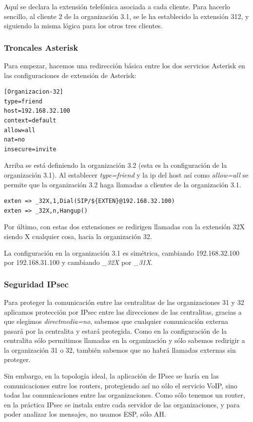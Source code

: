 \documentclass[]{article}
\begin{document}
Aquí se declara la extensión telefónica asociada a cada cliente. Para hacerlo sencillo, al cliente 2 de la organización 3.1, se le ha establecido la extensión 312, y siguiendo la misma lógica para los otros tres clientes.

\subsubsection{Troncales Asterisk}
Para empezar, hacemos una redirección básica entre los dos servicios Asterisk en las configuraciones de extensión de Asterisk:
\begin{Verbatim}
[Organizacion-32]
type=friend
host=192.168.32.100
context=default
allow=all
nat=no
insecure=invite
\end{Verbatim}

Arriba se está definiendo la organización 3.2 (esta es la configuración de la organización 3.1). Al establecer \textit{type=friend} y la ip del host así como \textit{allow=all} se permite que la organización 3.2 haga llamadas a clientes de la organización 3.1.

\begin{Verbatim}
exten => _32X,1,Dial(SIP/${EXTEN}@192.168.32.100)
exten => _32X,n,Hangup()
\end{Verbatim}

Por último, con estas dos extensiones se redirigen llamadas con la extensión 32X siendo X cualquier cosa, hacia la organización 32.

La configuración en la organización 3.1 es simétrica, cambiando 192.168.32.100 por 192.168.31.100 y cambiando \textit{\_32X} por \textit{\_31X}.

\subsubsection{Seguridad IPsec}

Para proteger la comunicación entre las centralitas de las organizaciones 31 y 32 aplicamos protección por IPsec entre las direcciones de las centralitas, gracias a que elegimos \textit{directmedia=no}, sabemos que cualquier comunicación externa pasará por la centralita y estará protegida. Como en la configuración de la centralita sólo permitimos llamadas en la organización y sólo sabemos redirigir a la organización 31 o 32, también sabemos que no habrá llamadas externas sin proteger.

Sin embargo, en la topología ideal, la aplicación de IPsec se haría en las comunicaciones entre los routers, protegiendo así no sólo el servicio VoIP, sino todas las comunicaciones entre las organizaciones. Como sólo tenemos un router, en la práctica IPsec se instala entre cada servidor de las organizaciones, y para poder analizar los mensajes, no usamos ESP, sólo AH.
\end{document}
